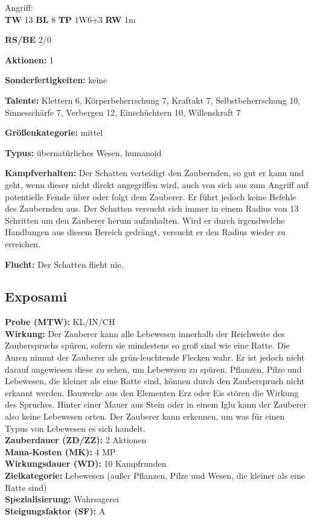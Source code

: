 Angriff: \\
\textbf{TW} 13 \textbf{BL} 8 \textbf{TP} 1W6+3 \textbf{RW} 1m

\textbf{RS/BE} 2/0

\textbf{Aktionen:} 1

\textbf{Sonderfertigkeiten:} keine

\textbf{Talente:} Klettern 6, Körperbeherrschung 7, Kraftakt 7, Selbstbeherrschung 10, Sinnesschärfe 7, Verbergen 12, Einschüchtern 10, Willenskraft 7

\textbf{Größenkategorie:} mittel

\textbf{Typus:} übernatürliches Wesen, humanoid

\textbf{Kampfverhalten:} Der Schatten verteidigt den Zaubernden, so gut er kann und geht, wenn dieser nicht direkt angegriffen wird, auch von sich aus zum Angriff auf potentielle Feinde über oder folgt dem Zauberer. Er führt jedoch keine Befehle des Zaubernden aus. Der Schatten versucht sich immer in einem Radius von 13 Schritten um den Zauberer herum aufzuhalten. Wird er durch irgendwelche Handlungen aus diesem Bereich gedrängt, versucht er den Radius wieder zu erreichen.

\textbf{Flucht:} Der Schatten flieht nie.


\subsection{Exposami}
\label{chap:exposami}
\textbf{Probe (MTW):} KL/IN/CH \\
\textbf{Wirkung:} Der Zauberer kann alle Lebewesen innerhalb der Reichweite des Zauberspruchs spüren, sofern sie mindestens so groß sind wie eine Ratte. Die Auren nimmt der Zauberer als grün-leuchtende Flecken wahr. Er ist jedoch nicht darauf angewiesen diese zu sehen, um Lebewesen zu spüren. Pflanzen, Pilze und Lebewesen, die kleiner als eine Ratte sind, können durch den Zauberspruch nicht erkannt werden. Bauwerke aus den Elementen Erz oder Eis stören die Wirkung des Spruches. Hinter einer Mauer aus Stein oder in einem Iglu kann der Zauberer also keine Lebewesen orten. Der Zauberer kann erkennen, um was für einen Typus von Lebewesen es sich handelt.\\
\textbf{Zauberdauer (ZD/ZZ):} 2 Aktionen \\
\textbf{Mana-Kosten (MK):} 4 MP \\
\textbf{Wirkungsdauer (WD):} 10 Kampfrunden \\
\textbf{Zielkategorie:} Lebewesen (außer Pflanzen, Pilze und Wesen, die kleiner als eine Ratte sind) \\
\textbf{Spezialisierung:} Wahrsagerei \\
\textbf{Steigungsfaktor (SF):} A


